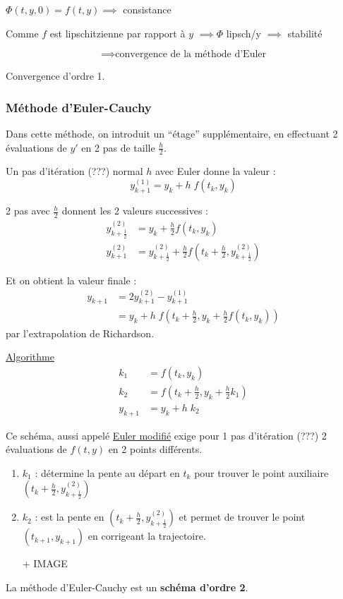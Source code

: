$\Phi(t,y,0) = f(t,y) \implies$ consistance

Comme $f$ est lipschitzienne par rapport à $y$ $\implies \Phi$ lipsch/y $\implies$ stabilité

\[
    \implies \text{convergence de la méthode d'Euler}
\]

Convergence d'ordre 1.

\subsubsection*{Méthode d'Euler-Cauchy}

Dans cette méthode, on introduit un ``étage'' supplémentaire, en effectuant 2 évaluations de
$y'$ en 2 pas de taille $\frac{h}{2}$.

Un pas d'itération (???) normal $h$ avec Euler donne la valeur :
\[
    y_{k+1}^{(1)} = y_k + h \; f(t_k,y_k)
\]

2 pas avec $\frac{h}{2}$ donnent les 2 valeurs successives :
\begin{align*}
    y_{k+\frac{1}{2}}^{(2)} & = y_k + \frac{h}{2} f(t_k,y_k) \\
    y_{k+1}^{(2)} & = y_{k+\frac{1}{2}}^{(2)} + \frac{h}{2} f(t_k+ \frac{h}{2}, y_{k+\frac{1}{2}}^{(2)})
\end{align*}

Et on obtient la valeur finale :
\begin{align*}
    y_{k+1} & = 2 y_{k+1}^{(2)} - y_{k+1}^{(1)} \\
    & = y_k + h \; f(t_k + \frac{h}{2}, y_k + \frac{h}{2} f(t_k,y_k))
\end{align*}
par l'extrapolation de Richardson.

\underline{Algorithme}
\[
    \boxed{\begin{aligned}
        k_1 & = f(t_k,y_k) \\
        k_2 & = f(t_k + \frac{h}{2}, y_k + \frac{h}{2}k_1) \\
        y_{k+1} & = y_k + h \; k_2
    \end{aligned}}
\]

Ce schéma, aussi appelé \underline{Euler modifié} exige pour 1 pas d'itération (???) 2 évaluations de $f(t,y)$ en 2 points différents.

\begin{enumerate}[label=-]
    \item $k_1$ : détermine la pente au départ en $t_k$ pour trouver le point auxiliaire $(t_k + \frac{h}{2},y_{k+\frac{1}{2}}^{(2)})$

    \item $k_2$ : est la pente en $(t_k + \frac{h}{2}, y_{k+\frac{1}{2}}^{(2)})$ et permet de trouver
        le point $(t_{k+1},y_{k+1})$ en corrigeant la trajectoire.

        + IMAGE
\end{enumerate}

La méthode d'Euler-Cauchy est un \textbf{schéma d'ordre 2}.
